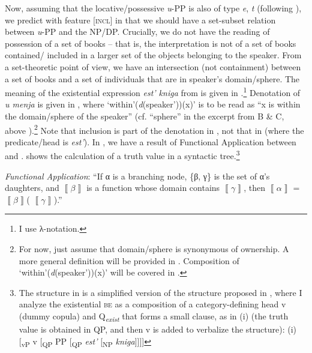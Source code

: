 \documentclass[output=paper,colorlinks,citecolor=brown,nonflat]{./langscibook}
\begin{document}
Now, assuming that the locative/possessive \textit{u}{}-PP is also of type {\textlangle}\textit{e}, \textit{t}{\textrangle} (following \citealt[65]{HeimKratzer1998}), we predict with feature [\textsc{incl}] in  that we should have a set-subset relation between \textit{u}{}-PP and the NP/DP. Crucially, we do not have the reading of possession of a set of books – that is, the interpretation is not of a set of books contained/ included in a larger set of the objects belonging to the speaker. From a set-theoretic point of view, we have an intersection (not containment) between a set of books and a set of individuals that are in speaker’s domain/sphere. The meaning of the existential expression \textit{est’ kniga} from  is given in .\footnote{I use  λ-notation.} Denotation of \textit{u menja} is given in , where ‘within'(\textit{d}(speaker'))(x)’ is to be read as “x is within the domain/sphere of the speaker” (cf. “sphere” in the excerpt from B \& C, above ).\footnote{For now, just assume that domain/sphere is synonymous of ownership. A more general definition will be provided in . Composition of ‘within\textrm{'}(\textit{d}(speaker\textrm{'}))(x)’ will be covered in .}  Note that inclusion is part of the denotation in , not that in  (where the predicate/head is \textit{est’}). In , we have a result of Functional Application between  and .  shows the calculation of a truth value in a syntactic tree.\footnote{The structure in  is a simplified version of the structure proposed in \citet{TsedrykInPress}, where I analyze the existential \textsc{be} as a composition of a category-defining head v (dummy copula) and Q\textit{\textsubscript{exist}} that forms a small clause, as in (i) (the truth value is obtained in QP, and then v is added to verbalize the structure):   (i)  [\textsubscript{vP} v [\textsubscript{QP} PP [\textsubscript{QP} \textit{est’} [\textsubscript{NP} \textit{kniga}]]]]} 

\ea%
    \label{ex:tsedryk:10}
    \textit{Functional Application}: “If α is a branching node, \{β, γ\} is the set of α’s daughters, and  $\left\llbracket \beta \right\rrbracket $  is a function whose domain contains  $\left\llbracket \gamma \right\rrbracket $, then  $\left\llbracket \alpha \right\rrbracket $ =  $\left\llbracket \beta \right\rrbracket $( $\left\llbracket \gamma \right\rrbracket $).” \hfill \citep[44]{HeimKratzer1998}
    \z
\end{document}
